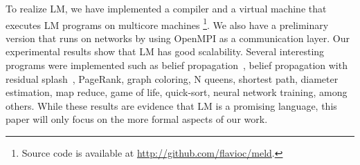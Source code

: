 To realize LM, we have implemented a compiler and a virtual machine that executes LM programs on multicore machines
\footnote{Source code is available at \url{http://github.com/flavioc/meld}.}. We also have a preliminary version that runs on networks by
using OpenMPI as a communication layer. Our experimental results show that LM has good scalability.
Several interesting programs were implemented such as belief propagation~\cite{Gonzalez+al:aistats09paraml},
belief propagation with residual splash~\cite{Gonzalez+al:aistats09paraml}, PageRank, graph coloring,
N queens, shortest path, diameter estimation, map reduce, game of life, quick-sort, neural network training, among others.
While these results are evidence that LM is a promising language, this paper will only focus on the more formal aspects of our work.
